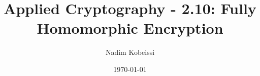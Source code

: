 \ifdefined\PRESENTATION\else\PassOptionsToClass{handout}{beamer}\fi\documentclass[aspectratio=169, lualatex]{beamer}
\title{Applied Cryptography - 2.10: Fully Homomorphic Encryption}
\author{Nadim Kobeissi}
\institute{Symbolic Software}
\date{\today}
\begin{document}
\begin{frame}[plain]
	\titlepage
\end{frame}

\incompleteslideswarning

\begin{frame}[plain]
	\titlepage
\end{frame}
\end{document}
